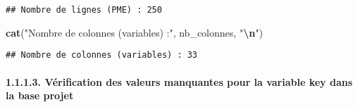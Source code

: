 \documentclass[
]{article}
\newenvironment{Shaded}{\begin{snugshade}}{\end{snugshade}}
\newcommand{\AttributeTok}[1]{\textcolor[rgb]{0.13,0.29,0.53}{#1}}
\newcommand{\CommentTok}[1]{\textcolor[rgb]{0.56,0.35,0.01}{\textit{#1}}}
\newcommand{\ControlFlowTok}[1]{\textcolor[rgb]{0.13,0.29,0.53}{\textbf{#1}}}
\newcommand{\FunctionTok}[1]{\textcolor[rgb]{0.13,0.29,0.53}{\textbf{#1}}}
\newcommand{\NormalTok}[1]{#1}
\newcommand{\OtherTok}[1]{\textcolor[rgb]{0.56,0.35,0.01}{#1}}
\newcommand{\SpecialCharTok}[1]{\textcolor[rgb]{0.81,0.36,0.00}{\textbf{#1}}}
\newcommand{\StringTok}[1]{\textcolor[rgb]{0.31,0.60,0.02}{#1}}
\begin{document}
\begin{verbatim}
## Nombre de lignes (PME) : 250
\end{verbatim}

\begin{Shaded}
\begin{Highlighting}[]
\FunctionTok{cat}\NormalTok{(}\StringTok{"Nombre de colonnes (variables) :"}\NormalTok{, nb\_colonnes, }\StringTok{"}\SpecialCharTok{\textbackslash{}n}\StringTok{"}\NormalTok{)}
\end{Highlighting}
\end{Shaded}

\begin{verbatim}
## Nombre de colonnes (variables) : 33
\end{verbatim}

\hypertarget{vuxe9rification-des-valeurs-manquantes-pour-la-variable-key-dans-la-base-projet}{%
\paragraph{1.1.1.3. Vérification des valeurs manquantes pour la variable
key dans la base
projet}\label{vuxe9rification-des-valeurs-manquantes-pour-la-variable-key-dans-la-base-projet}}

\begin{Shaded}
\end{Shaded}
\end{document}
